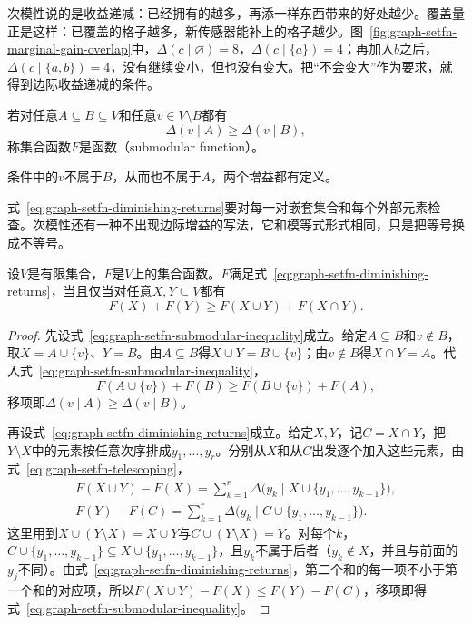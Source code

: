 次模性说的是收益递减：已经拥有的越多，再添一样东西带来的好处越少。覆盖量正是这样：已覆盖的格子越多，新传感器能补上的格子越少。图~\ref{fig:graph-setfn-marginal-gain-overlap}中，$\Delta(c\mid\varnothing)=8$，$\Delta(c\mid\{a\})=4$；再加入$b$之后，$\Delta(c\mid\{a,b\})=4$，没有继续变小，但也没有变大。把“不会变大”作为要求，就得到边际收益递减的条件。

\begin{definition}[次模函数]
\label{def:graph-setfn-submodular}
若对任意$A\subseteq B\subseteq V$和任意$v\in V\setminus B$都有
\begin{equation}
  \Delta(v\mid A)\geq\Delta(v\mid B),
  \label{eq:graph-setfn-diminishing-returns}
\end{equation}
称集合函数$F$是函数（submodular function）。
\end{definition}

条件中的$v$不属于$B$，从而也不属于$A$，两个增益都有定义。

式~\eqref{eq:graph-setfn-diminishing-returns}要对每一对嵌套集合和每个外部元素检查。次模性还有一种不出现边际增益的写法，它和模等式形式相同，只是把等号换成不等号。

\begin{theorem}[次模性的两种刻画]
\label{thm:graph-setfn-submodular-equivalence}
设$V$是有限集合，$F$是$V$上的集合函数。$F$满足式~\eqref{eq:graph-setfn-diminishing-returns}，当且仅当对任意$X,Y\subseteq V$都有
\begin{equation}
  F(X)+F(Y)\geq F(X\cup Y)+F(X\cap Y).
  \label{eq:graph-setfn-submodular-inequality}
\end{equation}
\end{theorem}

\begin{proof}
先设式~\eqref{eq:graph-setfn-submodular-inequality}成立。给定$A\subseteq B$和$v\notin B$，取$X=A\cup\{v\}$、$Y=B$。由$A\subseteq B$得$X\cup Y=B\cup\{v\}$；由$v\notin B$得$X\cap Y=A$。代入式~\eqref{eq:graph-setfn-submodular-inequality}，
\[
  F(A\cup\{v\})+F(B)\geq F(B\cup\{v\})+F(A),
\]
移项即$\Delta(v\mid A)\geq\Delta(v\mid B)$。

再设式~\eqref{eq:graph-setfn-diminishing-returns}成立。给定$X,Y$，记$C=X\cap Y$，把$Y\setminus X$中的元素按任意次序排成$y_1,\ldots,y_r$。分别从$X$和从$C$出发逐个加入这些元素，由式~\eqref{eq:graph-setfn-telescoping}，
\[
  \begin{gathered}
  F(X\cup Y)-F(X)=\sum_{k=1}^{r}\Delta\bigl(y_k\mid X\cup\{y_1,\ldots,y_{k-1}\}\bigr),\\
  F(Y)-F(C)=\sum_{k=1}^{r}\Delta\bigl(y_k\mid C\cup\{y_1,\ldots,y_{k-1}\}\bigr).
  \end{gathered}
\]
这里用到$X\cup(Y\setminus X)=X\cup Y$与$C\cup(Y\setminus X)=Y$。对每个$k$，$C\cup\{y_1,\ldots,y_{k-1}\}\subseteq X\cup\{y_1,\ldots,y_{k-1}\}$，且$y_k$不属于后者（$y_k\notin X$，并且与前面的$y_j$不同）。由式~\eqref{eq:graph-setfn-diminishing-returns}，第二个和的每一项不小于第一个和的对应项，所以$F(X\cup Y)-F(X)\leq F(Y)-F(C)$，移项即得式~\eqref{eq:graph-setfn-submodular-inequality}。
\end{proof}


